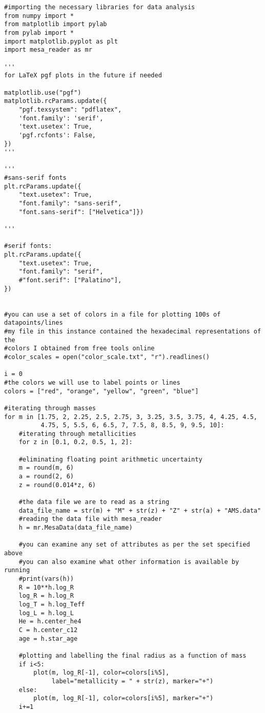 \documentclass[12pt,hidelinks]{article}
\begin{document}
            \begin{lstlisting}
#importing the necessary libraries for data analysis
from numpy import *
from matplotlib import pylab
from pylab import *
import matplotlib.pyplot as plt
import mesa_reader as mr

'''
for LaTeX pgf plots in the future if needed

matplotlib.use("pgf")
matplotlib.rcParams.update({
    "pgf.texsystem": "pdflatex",
    'font.family': 'serif',
    'text.usetex': True,
    'pgf.rcfonts': False,
})
'''

'''
#sans-serif fonts
plt.rcParams.update({
    "text.usetex": True,
    "font.family": "sans-serif",
    "font.sans-serif": ["Helvetica"]})

'''

#serif fonts:
plt.rcParams.update({
    "text.usetex": True,
    "font.family": "serif",
    #"font.serif": ["Palatino"],
})


#you can use a set of colors in a file for plotting 100s of datapoints/lines
#my file in this instance contained the hexadecimal representations of the 
#colors I obtained from free tools online
#color_scales = open("color_scale.txt", "r").readlines()

i = 0
#the colors we will use to label points or lines
colors = ["red", "orange", "yellow", "green", "blue"]

#iterating through masses
for m in [1.75, 2, 2.25, 2.5, 2.75, 3, 3.25, 3.5, 3.75, 4, 4.25, 4.5,
          4.75, 5, 5.5, 6, 6.5, 7, 7.5, 8, 8.5, 9, 9.5, 10]:
    #iterating through metallicities
    for z in [0.1, 0.2, 0.5, 1, 2]:

    #eliminating floating point arithmetic uncertainty
    m = round(m, 6)
    a = round(2, 6)
    z = round(0.014*z, 6)

    #the data file we are to read as a string
    data_file_name = str(m) + "M" + str(z) + "Z" + str(a) + "AMS.data"
    #reading the data file with mesa_reader
    h = mr.MesaData(data_file_name)

    #you can examine any set of attributes as per the set specified above
    #you can also examine what other information is available by running 
    #print(vars(h))
    R = 10**h.log_R
    log_R = h.log_R
    log_T = h.log_Teff
    log_L = h.log_L
    He = h.center_he4
    C = h.center_c12
    age = h.star_age

    #plotting and labelling the final radius as a function of mass
    if i<5:
        plot(m, log_R[-1], color=colors[i%5],
             label="metallicity = " + str(z), marker="+")
    else:
        plot(m, log_R[-1], color=colors[i%5], marker="+")
    i+=1


\end{lstlisting}
\end{document}
